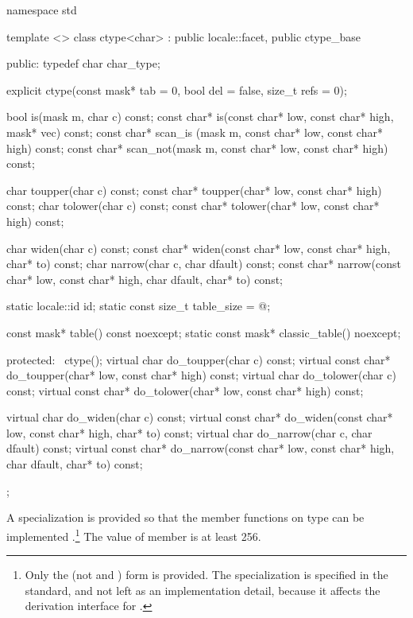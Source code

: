 %
\begin{codeblock}
namespace std {
  template <> class ctype<char>
    : public locale::facet, public ctype_base {
  public:
    typedef char char_type;

    explicit ctype(const mask* tab = 0, bool del = false,
                   size_t refs = 0);

    bool is(mask m, char c) const;
    const char* is(const char* low, const char* high, mask* vec) const;
    const char* scan_is (mask m,
                         const char* low, const char* high) const;
    const char* scan_not(mask m,
                         const char* low, const char* high) const;

    char        toupper(char c) const;
    const char* toupper(char* low, const char* high) const;
    char        tolower(char c) const;
    const char* tolower(char* low, const char* high) const;

    char  widen(char c) const;
    const char* widen(const char* low, const char* high, char* to) const;
    char  narrow(char c, char dfault) const;
    const char* narrow(const char* low, const char* high, char dfault,
                       char* to) const;

    static locale::id id;
    static const size_t table_size = @\impdef@;

    const mask* table() const noexcept;
    static const mask* classic_table() noexcept;

  protected:
   ~ctype();
    virtual char        do_toupper(char c) const;
    virtual const char* do_toupper(char* low, const char* high) const;
    virtual char        do_tolower(char c) const;
    virtual const char* do_tolower(char* low, const char* high) const;

    virtual char        do_widen(char c) const;
    virtual const char* do_widen(const char* low,
                                 const char* high,
                                 char* to) const;
    virtual char        do_narrow(char c, char dfault) const;
    virtual const char* do_narrow(const char* low,
                                  const char* high,
                                  char dfault, char* to) const;
  };
}
\end{codeblock}

\pnum
A specialization
is provided so that the member functions on type
can be implemented
.\footnote{Only the
(not
and
)
form is provided.
The specialization is specified in the standard, and not left as an
implementation detail, because it affects the derivation interface for
.}
The  value of member
is at least 256.

